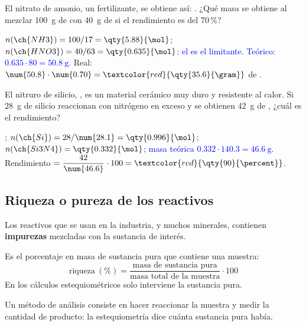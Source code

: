 \begin{exercise}
    El nitrato de amonio, un fertilizante, se obtiene así: . ¿Qué masa se obtiene al mezclar
    \qty{100}{\gram} de  con \qty{40}{\gram} de  si el rendimiento es del 70\,\%?
    \begin{solu}
        \textcolor{blue}{\(n(\ch{NH3}) = 100/17 = \qty{5.88}{\mol}\); \(n(\ch{HNO3}) = 40/63 = \qty{0.635}{\mol}\): el  es el
        limitante. Teórico: \(\num{0.635} \cdot 80 = \qty{50.8}{\gram}\).} Real: \(\num{50.8} \cdot \num{0.70} =
        \textcolor{red}{\qty{35.6}{\gram}}\) de .
    \end{solu}
\end{exercise}

\begin{exercise}
    El nitruro de silicio, , es un material cerámico muy duro y resistente al calor. Si \qty{28}{\gram} de silicio
    reaccionan con nitrógeno en exceso y se obtienen \qty{42}{\gram} de , ¿cuál es el rendimiento?
    \begin{solu}
        \textcolor{blue}{; \(n(\ch{Si}) = 28/\num{28.1} = \qty{0.996}{\mol}\); \(n(\ch{Si3N4}) = \qty{0.332}{\mol}\);
        masa teórica \(\num{0.332} \cdot \num{140.3} = \qty{46.6}{\gram}\).} Rendimiento \(= \dfrac{42}{\num{46.6}} \cdot 100 =
        \textcolor{red}{\qty{90}{\percent}}\).
    \end{solu}
\end{exercise}

\subsection{Riqueza o pureza de los reactivos}

Los reactivos que se usan en la industria, y muchos minerales, contienen \textbf{impurezas} mezcladas con la sustancia de interés.

\begin{definition}[Riqueza]
    Es el porcentaje en masa de sustancia pura que contiene una muestra:
    \[ \text{riqueza}\ (\%) = \frac{\text{masa de sustancia pura}}{\text{masa total de la muestra}} \cdot 100 \]
    En los cálculos estequiométricos solo interviene la sustancia pura.
\end{definition}

Un método de análisis consiste en hacer reaccionar la muestra y medir la cantidad de producto: la estequiometría dice cuánta
sustancia pura había.

